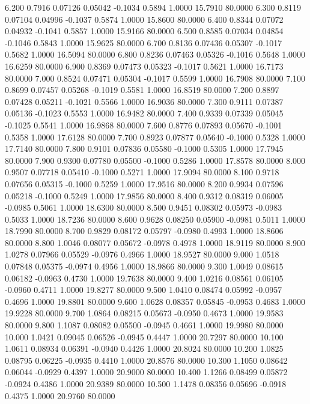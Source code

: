    6.200   0.7916   0.07126   0.05042  -0.1034   0.5894   1.0000  15.7910  80.0000
   6.300   0.8119   0.07104   0.04996  -0.1037   0.5874   1.0000  15.8600  80.0000
   6.400   0.8344   0.07072   0.04932  -0.1041   0.5857   1.0000  15.9166  80.0000
   6.500   0.8585   0.07034   0.04854  -0.1046   0.5843   1.0000  15.9625  80.0000
   6.700   0.8136   0.07436   0.05307  -0.1017   0.5682   1.0000  16.5094  80.0000
   6.800   0.8236   0.07463   0.05326  -0.1016   0.5648   1.0000  16.6259  80.0000
   6.900   0.8369   0.07473   0.05323  -0.1017   0.5621   1.0000  16.7173  80.0000
   7.000   0.8524   0.07471   0.05304  -0.1017   0.5599   1.0000  16.7908  80.0000
   7.100   0.8699   0.07457   0.05268  -0.1019   0.5581   1.0000  16.8519  80.0000
   7.200   0.8897   0.07428   0.05211  -0.1021   0.5566   1.0000  16.9036  80.0000
   7.300   0.9111   0.07387   0.05136  -0.1023   0.5553   1.0000  16.9482  80.0000
   7.400   0.9339   0.07339   0.05045  -0.1025   0.5541   1.0000  16.9868  80.0000
   7.600   0.8776   0.07893   0.05670  -0.1001   0.5358   1.0000  17.6128  80.0000
   7.700   0.8923   0.07877   0.05640  -0.1000   0.5328   1.0000  17.7140  80.0000
   7.800   0.9101   0.07836   0.05580  -0.1000   0.5305   1.0000  17.7945  80.0000
   7.900   0.9300   0.07780   0.05500  -0.1000   0.5286   1.0000  17.8578  80.0000
   8.000   0.9507   0.07718   0.05410  -0.1000   0.5271   1.0000  17.9094  80.0000
   8.100   0.9718   0.07656   0.05315  -0.1000   0.5259   1.0000  17.9516  80.0000
   8.200   0.9934   0.07596   0.05218  -0.1000   0.5249   1.0000  17.9856  80.0000
   8.400   0.9312   0.08319   0.06005  -0.0985   0.5061   1.0000  18.6300  80.0000
   8.500   0.9451   0.08302   0.05973  -0.0983   0.5033   1.0000  18.7236  80.0000
   8.600   0.9628   0.08250   0.05900  -0.0981   0.5011   1.0000  18.7990  80.0000
   8.700   0.9829   0.08172   0.05797  -0.0980   0.4993   1.0000  18.8606  80.0000
   8.800   1.0046   0.08077   0.05672  -0.0978   0.4978   1.0000  18.9119  80.0000
   8.900   1.0278   0.07966   0.05529  -0.0976   0.4966   1.0000  18.9527  80.0000
   9.000   1.0518   0.07848   0.05375  -0.0974   0.4956   1.0000  18.9866  80.0000
   9.300   1.0049   0.08615   0.06182  -0.0963   0.4730   1.0000  19.7638  80.0000
   9.400   1.0216   0.08561   0.06105  -0.0960   0.4711   1.0000  19.8277  80.0000
   9.500   1.0410   0.08474   0.05992  -0.0957   0.4696   1.0000  19.8801  80.0000
   9.600   1.0628   0.08357   0.05845  -0.0953   0.4683   1.0000  19.9228  80.0000
   9.700   1.0864   0.08215   0.05673  -0.0950   0.4673   1.0000  19.9583  80.0000
   9.800   1.1087   0.08082   0.05500  -0.0945   0.4661   1.0000  19.9980  80.0000
  10.000   1.0421   0.09045   0.06526  -0.0945   0.4447   1.0000  20.7297  80.0000
  10.100   1.0611   0.08934   0.06391  -0.0940   0.4426   1.0000  20.8024  80.0000
  10.200   1.0825   0.08795   0.06225  -0.0935   0.4410   1.0000  20.8576  80.0000
  10.300   1.1050   0.08642   0.06044  -0.0929   0.4397   1.0000  20.9000  80.0000
  10.400   1.1266   0.08499   0.05872  -0.0924   0.4386   1.0000  20.9389  80.0000
  10.500   1.1478   0.08356   0.05696  -0.0918   0.4375   1.0000  20.9760  80.0000
